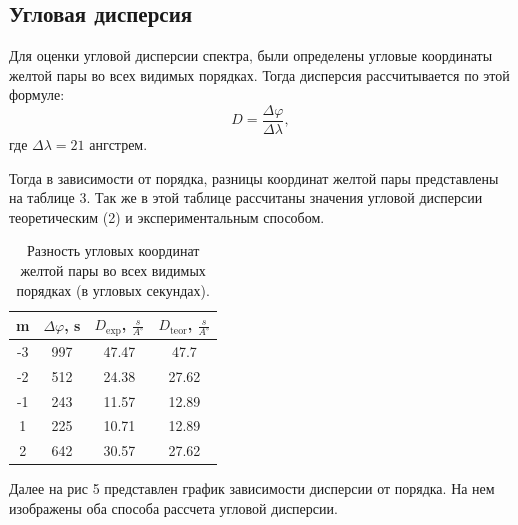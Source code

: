 \documentclass[a4paper, 14pt]{extarticle}%
\newcommand\ECaption[1]{%
     \captionsetup{font=footnotesize}%
     \caption{#1}}
\begin{document}
\subsection*{Угловая дисперсия}

Для оценки угловой дисперсии спектра, были определены угловые координаты желтой пары во всех видимых порядках. Тогда дисперсия рассчитывается по этой формуле:
\begin{equation}
D = \dfrac{\Delta\varphi}{\Delta\lambda},
\end{equation}
где $\Delta\lambda = 21$ ангстрем.

Тогда в зависимости от порядка, разницы координат желтой пары представлены на таблице 3. Так же в этой таблице рассчитаны значения угловой дисперсии теоретическим (2) и экспериментальным способом.

\begin{table}[h!]
\begin{center}
\begin{tabular}{|c|c|c|c|}
\hline
\rowcolor[HTML]{9698ED} 
m  & $\Delta\varphi$, s & $D_{\text{exp}}$, $\frac{s}{A^{\circ}}$ & $D_{\text{teor}}$, $\frac{s}{A^{\circ}}$ \\ \hline
-3 & 997   & 47.47 & 47.7  \\ \hline
\rowcolor[HTML]{9698ED} 
-2 & 512   & 24.38 & 27.62  \\ \hline
-1 & 243   & 11.57 & 12.89 \\ \hline
\rowcolor[HTML]{9698ED} 
1  & 225   & 10.71 & 12.89 \\ \hline
2  & 642   & 30.57 & 27.62  \\ \hline
\end{tabular}
\ECaption{Разность угловых координат желтой пары во всех видимых порядках (в угловых секундах).}
\end{center}
\end{table}

Далее на рис 5 представлен график зависимости дисперсии от порядка. На нем изображены оба способа рассчета угловой дисперсии.
\end{document}
